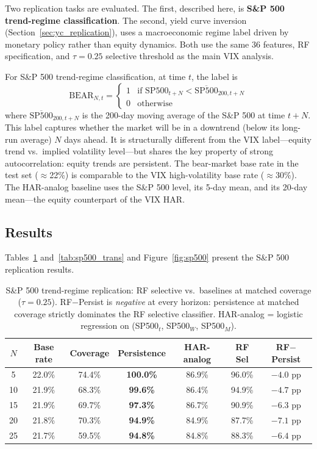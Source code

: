 \documentclass[11pt]{article}
\begin{document}
Two replication tasks are evaluated. The first, described here, is \textbf{S\&P 500 trend-regime classification}. The second, yield curve inversion (Section~\ref{sec:yc_replication}), uses a macroeconomic regime label driven by monetary policy rather than equity dynamics. Both use the same 36 features, RF specification, and $\tau = 0.25$ selective threshold as the main VIX analysis.

For S\&P 500 trend-regime classification, at time $t$, the label is
\begin{equation}
    \text{BEAR}_{N,t} = \begin{cases} 1 & \text{if } \text{SP500}_{t+N} < \overline{\text{SP500}}_{200,t+N} \\ 0 & \text{otherwise} \end{cases}
\end{equation}
where $\overline{\text{SP500}}_{200,t+N}$ is the 200-day moving average of the S\&P 500 at time $t + N$. This label captures whether the market will be in a downtrend (below its long-run average) $N$ days ahead. It is structurally different from the VIX label---equity trend vs.\ implied volatility level---but shares the key property of strong autocorrelation: equity trends are persistent. The bear-market base rate in the test set ($\approx$22\%) is comparable to the VIX high-volatility base rate ($\approx$30\%). The HAR-analog baseline uses the S\&P 500 level, its 5-day mean, and its 20-day mean---the equity counterpart of the VIX HAR.

\subsection{Results}

Tables~\ref{tab:sp500} and~\ref{tab:sp500_trans} and Figure~\ref{fig:sp500} present the S\&P 500 replication results.

\begin{table}[H]
\centering
\caption{S\&P 500 trend-regime replication: RF selective vs.\ baselines at matched coverage ($\tau = 0.25$). RF$-$Persist is \emph{negative} at every horizon: persistence at matched coverage strictly dominates the RF selective classifier. HAR-analog = logistic regression on (SP500$_t$, SP500$_{W}$, SP500$_{M}$).}
\label{tab:sp500}
\begin{tabular}{ccccccc}
\toprule
$N$ & Base rate & Coverage & Persistence & HAR-analog & RF Sel & RF$-$Persist \\
\midrule
5  & 22.0\% & 74.4\% & \textbf{100.0\%} & 86.9\% & 96.0\% & $-4.0$ pp \\
10 & 21.9\% & 68.3\% & \textbf{99.6\%}  & 86.4\% & 94.9\% & $-4.7$ pp \\
15 & 21.9\% & 69.7\% & \textbf{97.3\%}  & 86.7\% & 90.9\% & $-6.3$ pp \\
20 & 21.8\% & 70.3\% & \textbf{94.9\%}  & 84.9\% & 87.7\% & $-7.1$ pp \\
25 & 21.7\% & 59.5\% & \textbf{94.8\%}  & 84.8\% & 88.3\% & $-6.4$ pp \\
\bottomrule
\end{tabular}
\end{table}
\end{document}

